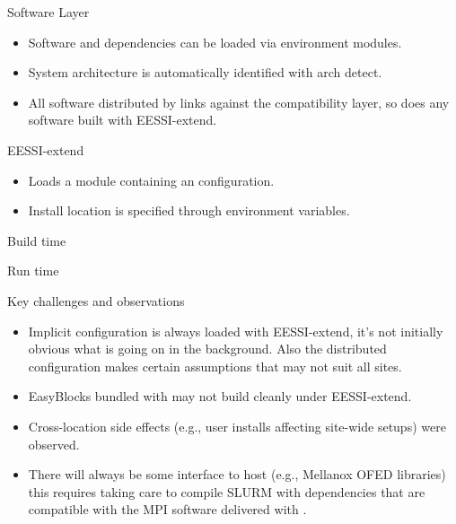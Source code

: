 \documentclass[final]{beamer}
\begin{document}
\begin{frame}[t]
\begin{columns}[t]
\begin{column}{0.48\textwidth}
      \begin{block}{Software Layer}
          \begin{itemize}
              \item Software and dependencies can be loaded via environment modules.
              \item System architecture is automatically identified with
                  arch detect.
              \item All software distributed by \eessi{} links against the
                  compatibility layer, so does any software built with
                  EESSI-extend.
          \end{itemize}
      \end{block}


      \begin{block}{EESSI-extend}
          \begin{itemize}
              \item Loads a module containing an \easybuild{} configuration.
              \item Install location is specified through environment variables.
           \end{itemize}
      \end{block}
      
      \begin{block}{Build time}
        
      \end{block}

      \begin{block}{Run time}
        
      \end{block}




      \begin{block} {Key challenges and observations}
          \begin{itemize}
              \item Implicit \easybuild{} configuration is always loaded with
                EESSI-extend, it's not initially obvious what is going on in the
                  background. Also the distributed configuration makes certain
                  assumptions that may not suit all sites.
            \item EasyBlocks bundled with \eessi{} may not build cleanly under EESSI-extend.
            \item Cross-location side effects (e.g., user installs affecting site-wide setups) were observed.
            \item There will always be some interface to host (e.g., Mellanox OFED
                libraries) this requires taking care to compile SLURM with
                  dependencies that are compatible with the MPI software
                  delivered with \eessi{}.
          \end{itemize}
      \end{block}


\end{column}
\end{columns}
\end{frame}
\end{document}
